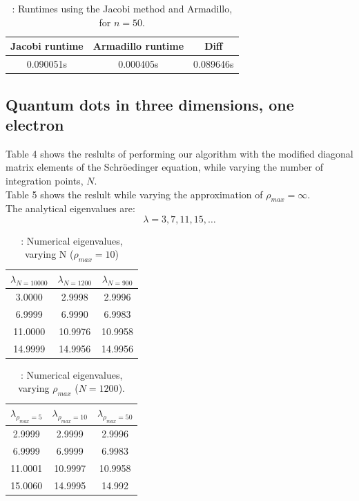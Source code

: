 \documentclass{article}
\begin{document}
	\begin{table}[h!]
		\caption{: Runtimes using the Jacobi method and Armadillo, for $n=50$.}
		\begin{tabular}{c c c}
			Jacobi runtime & Armadillo runtime & Diff\\
			\hline
			0.090051s & 0.000405s & 0.089646s
		\end{tabular}
	\end{table}

	\subsection{Quantum dots in three dimensions, one electron}
		Table 4 shows the reslults of performing our algorithm with the modified diagonal matrix elements
		of the Schröedinger equation, while varying the number of integration points, $N$. \\
		Table 5 shows the reslult while varying the approximation of $\rho_{max} = \infty$. \\
		The analytical eigenvalues are:
		\begin{equation*}
			\lambda = 3,7,11,15,\hdots
		\end{equation*}


		\begin{table}[h!]
			\caption{: Numerical eigenvalues, varying N ($\rho_{max} = 10$)}
			\begin{tabular}{c c c}
				$\lambda_{N=10000}$ & $\lambda_{N=1200}$ & $\lambda_{N=900}$ \\
				\hline
				3.0000 & 2.9998 & 2.9996  \\
				6.9999 & 6.9990 & 6.9983  \\
				11.0000 & 10.9976 & 10.9958  \\
				14.9999 & 14.9956 & 14.9956  \\
			\end{tabular}
		\end{table}
		\begin{table}[h!]
			\caption{: Numerical eigenvalues, varying $\rho_{max}$ ($N = 1200$).}
			\begin{tabular}{c c c}
				$\lambda_{\rho_{max} = 5}$ & $\lambda_{\rho_{max} = 10}$ & $\lambda_{\rho_{max} = 50}$\\
				\hline
				2.9999 & 2.9999 & 2.9996 \\
				6.9999 & 6.9999 & 6.9983 \\
				11.0001 & 10.9997 & 10.9958 \\
				15.0060 & 14.9995 & 14.992 \\
			\end{tabular}
		\end{table}
\end{document}
